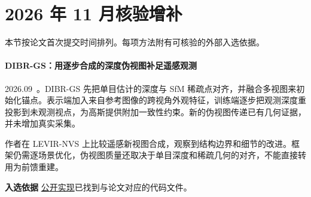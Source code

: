\section{2026 年 11 月核验增补}

本节按论文首次提交时间排列。每项方法附有可核验的外部入选依据。

\paragraph{DIBR-GS：用逐步合成的深度伪视图补足遥感观测}
2026.09~\cite{2609_35612}。DIBR-GS 先把单目估计的深度与 SfM 稀疏点对齐，并融合多视图来初始化锚点。表示端加入来自参考图像的跨视角外观特征，训练端逐步把观测深度重投影到未观测视点，为高斯提供附加一致性约束。新的伪视图传递已有几何证据，并未增加真实采集。

作者在 LEVIR-NVS 上比较遥感新视图合成，观察到结构边界和细节的改进。框架仍需逐场景优化，伪视图质量还取决于单目深度和稀疏几何的对齐，不能直接转用为前馈重建。

\textbf{入选依据} \href{https://github.com/kanehub/dibr-gs}{公开实现}已找到与论文对应的代码文件。
